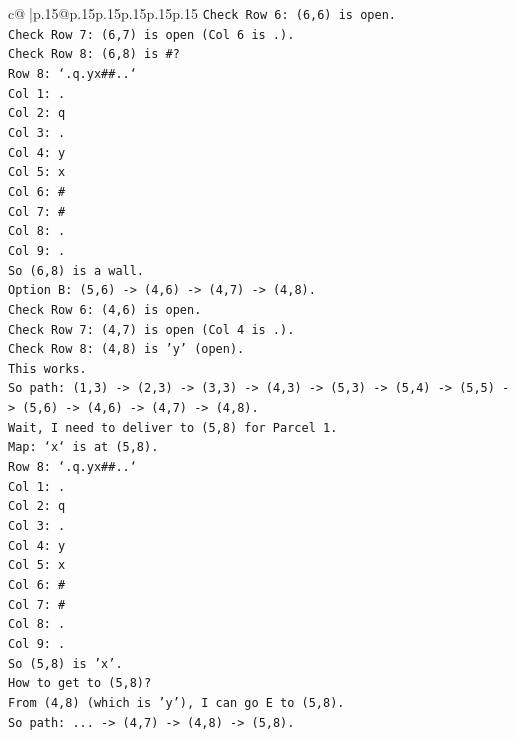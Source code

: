 \documentclass{article}
\begin{document}
{\begin{supertabular}{c@{$\;$}|p{.15\linewidth}@{}p{.15\linewidth}p{.15\linewidth}p{.15\linewidth}p{.15\linewidth}p{.15\linewidth}}
{{{\texttt{Check Row 6: (6,6) is open.} \\
\texttt{Check Row 7: (6,7) is open (Col 6 is .).} \\
\texttt{Check Row 8: (6,8) is \#?} \\
\texttt{Row 8: `.q.yx\#\#..`} \\
\texttt{Col 1: .} \\
\texttt{Col 2: q} \\
\texttt{Col 3: .} \\
\texttt{Col 4: y} \\
\texttt{Col 5: x} \\
\texttt{Col 6: \#} \\
\texttt{Col 7: \#} \\
\texttt{Col 8: .} \\
\texttt{Col 9: .} \\
\texttt{So (6,8) is a wall.} \\
\texttt{Option B: (5,6) {-}> (4,6) {-}> (4,7) {-}> (4,8).} \\
\texttt{Check Row 6: (4,6) is open.} \\
\texttt{Check Row 7: (4,7) is open (Col 4 is .).} \\
\texttt{Check Row 8: (4,8) is 'y' (open).} \\
\texttt{This works.} \\
\texttt{So path: (1,3) {-}> (2,3) {-}> (3,3) {-}> (4,3) {-}> (5,3) {-}> (5,4) {-}> (5,5) {-}> (5,6) {-}> (4,6) {-}> (4,7) {-}> (4,8).} \\
\texttt{Wait, I need to deliver to (5,8) for Parcel 1.} \\
\texttt{Map: `x` is at (5,8).} \\
\texttt{Row 8: `.q.yx\#\#..`} \\
\texttt{Col 1: .} \\
\texttt{Col 2: q} \\
\texttt{Col 3: .} \\
\texttt{Col 4: y} \\
\texttt{Col 5: x} \\
\texttt{Col 6: \#} \\
\texttt{Col 7: \#} \\
\texttt{Col 8: .} \\
\texttt{Col 9: .} \\
\texttt{So (5,8) is 'x'.} \\
\texttt{How to get to (5,8)?} \\
\texttt{From (4,8) (which is 'y'), I can go E to (5,8).} \\
\texttt{So path: ... {-}> (4,7) {-}> (4,8) {-}> (5,8).} \\
}}}
\end{supertabular}}
\end{document}
